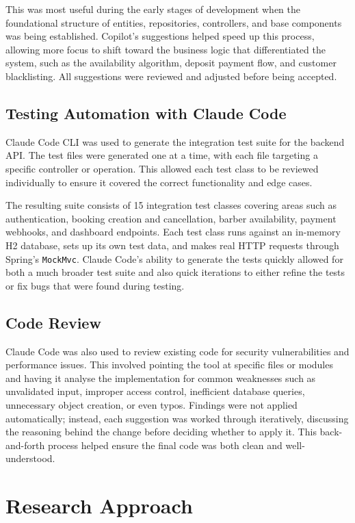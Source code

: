 This was most useful during the early stages of development when the foundational structure of entities, repositories, controllers, and base components was being established. Copilot's suggestions helped speed up this process, allowing more focus to shift toward the business logic that differentiated the system, such as the availability algorithm, deposit payment flow, and customer blacklisting. All suggestions were reviewed and adjusted before being accepted.

\subsection*{Testing Automation with Claude Code}
Claude Code CLI was used to generate the integration test suite for the backend API. The test files were generated one at a time, with each file targeting a specific controller or operation. This allowed each test class to be reviewed individually to ensure it covered the correct functionality and edge cases.

The resulting suite consists of 15 integration test classes covering areas such as authentication, booking creation and cancellation, barber availability, payment webhooks, and dashboard endpoints. Each test class runs against an in-memory H2 database, sets up its own test data, and makes real HTTP requests through Spring's \texttt{MockMvc}. Claude Code's ability to generate the tests quickly allowed for both a much broader test suite and also quick iterations to either refine the tests or fix bugs that were found during testing.

\subsection*{Code Review}
Claude Code was also used to review existing code for security vulnerabilities and performance issues. This involved pointing the tool at specific files or modules and having it analyse the implementation for common weaknesses such as unvalidated input, improper access control, inefficient database queries, unnecessary object creation, or even typos. Findings were not applied automatically; instead, each suggestion was worked through iteratively, discussing the reasoning behind the change before deciding whether to apply it. This back-and-forth process helped ensure the final code was both clean and well-understood.

\section{Research Approach}
